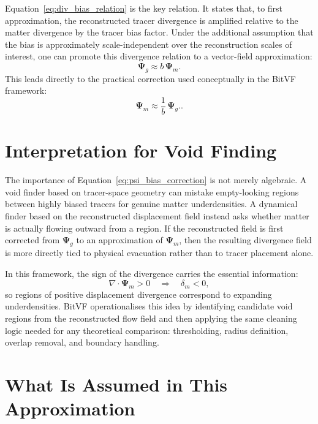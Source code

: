\documentclass[12pt]{report}
\begin{document}
Equation~\ref{eq:div_bias_relation} is the key relation. It states that, to first approximation, the reconstructed tracer divergence is amplified relative to the matter divergence by the tracer bias factor. Under the additional assumption that the bias is approximately scale-independent over the reconstruction scales of interest, one can promote this divergence relation to a vector-field approximation:
\begin{equation}
    \boldsymbol{\Psi}_g \approx b\,\boldsymbol{\Psi}_m.
\end{equation}
This leads directly to the practical correction used conceptually in the BitVF framework:
\begin{equation}
    \boldsymbol{\Psi}_m \approx \frac{1}{b}\,\boldsymbol{\Psi}_g.
    \label{eq:psi_bias_correction}.
\end{equation}

\section{Interpretation for Void Finding}

The importance of Equation~\ref{eq:psi_bias_correction} is not merely algebraic. A void finder based on tracer-space geometry can mistake empty-looking regions between highly biased tracers for genuine matter underdensities. A dynamical finder based on the reconstructed displacement field instead asks whether matter is actually flowing outward from a region. If the reconstructed field is first corrected from $\boldsymbol{\Psi}_g$ to an approximation of $\boldsymbol{\Psi}_m$, then the resulting divergence field is more directly tied to physical evacuation rather than to tracer placement alone.

In this framework, the sign of the divergence carries the essential information:
\begin{equation}
    \nabla \cdot \boldsymbol{\Psi}_m > 0
    \quad \Longrightarrow \quad
    \delta_m < 0,
\end{equation}
so regions of positive displacement divergence correspond to expanding underdensities. BitVF operationalises this idea by identifying candidate void regions from the reconstructed flow field and then applying the same cleaning logic needed for any theoretical comparison: thresholding, radius definition, overlap removal, and boundary handling.

\section{What Is Assumed in This Approximation}
\end{document}
